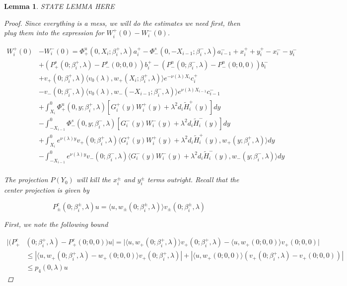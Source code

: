 \documentclass[12pt]{article}
\newtheorem{lemma}{Lemma}
\begin{document}
\begin{lemma}
STATE LEMMA HERE
\begin{proof}

Since everything is a mess, we will do the estimates we need first, then plug them into the expression for $W_i^+(0) - W_i^-(0)$.

\begin{align*}
W_i^+(0) &- W_i^-(0) = \Phi^u_+(0, X_i; \beta_i^+, \lambda)a_i^+ - \Phi^s_-(0, -X_{i-1}; \beta_i^-, \lambda)a_{i-1}^- + x_i^+ + y_i^+ - x_i^- - y_i^- \\
&+ (P^s_+(0; \beta_i^+, \lambda) - P^s_-(0; 0, 0))b_i^+ - (P^u_-(0; \beta_i^-, \lambda) - P^u_-(0; 0, 0))b_i^- \\
&+ v_+(0; \beta_i^+, \lambda) \langle v_0(\lambda), w_+(X_i; \beta_i^+, \lambda) \rangle e^{-\nu(\lambda)X_i} c_i^+ \\
&- v_-(0; \beta_i^-, \lambda) \langle v_0(\lambda), w_-(-X_{i-1}; \beta_i^-, \lambda) \rangle e^{\nu(\lambda)X_{i-1}} c_{i-1}^- \\
&+ \int_{X_i}^0 \Phi^u_+(0, y; \beta_i^+, \lambda) [ G_i^+(y)W_i^+(y) + \lambda^2 d_i \tilde{H}_i^+(y) ] dy \\
&- \int_{-X_{i-1}}^0 \Phi^s_-(0, y; \beta_i^-, \lambda) [ G_i^-(y)W_i^-(y) + \lambda^2 d_i \tilde{H}_i^-(y) ] dy \\
&+ \int_{X_i}^0 e^{\nu(\lambda)y} v_+(0; \beta_i^+, \lambda) \langle G_i^+(y)W_i^+(y) + \lambda^2 d_i \tilde{H}_i^+(y), w_+(y; \beta_i^+, \lambda) \rangle dy \\
&- \int_{-X_{i-1}}^0
e^{\nu(\lambda)y} v_-(0; \beta_i^-, \lambda) \langle G_i^-(y)W_i^-(y) + \lambda^2 d_i \tilde{H}_i^-(y), w_-(y; \beta_i^-, \lambda) \rangle dy \\
\end{align*}

The projection $P(Y_0)$ will kill the $x_i^\pm$ and $y_i^\pm$ terms outright. Recall that the center projection is given by

\[
P^c_\pm(0; \beta_i^\pm, \lambda)u = \langle u, w_\pm(0; \beta_i^\pm, \lambda) \rangle v_\pm(0; \beta_i^\pm, \lambda)
\]

First, we note the following bound

\begin{align*}
|(P^c_+&(0; \beta_i^+, \lambda) - P^c_+(0; 0, 0) )u| = |\langle u, w_+(0; \beta_i^+, \lambda) \rangle v_+(0; \beta_i^+, \lambda) - \langle u, w_+(0; 0, 0) \rangle v_+(0; 0, 0)| \\
&\leq |\langle u, w_+(0; \beta_i^+, \lambda) - w_+(0; 0, 0) \rangle v_+(0; \beta_i^+, \lambda)| + | \langle u, w_+(0; 0, 0) \rangle( v_+(0; \beta_i^+, \lambda) - v_+(0; 0, 0))| \\
&\leq p_4(0, \lambda) u
\end{align*}


\end{proof}
\end{lemma}
\end{document}

